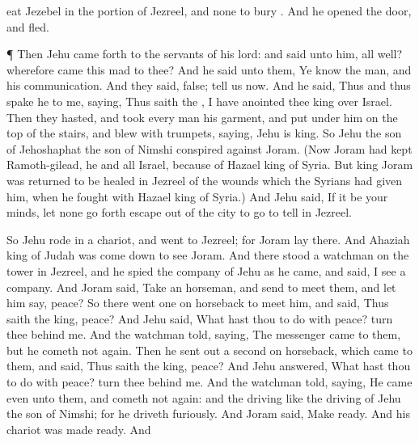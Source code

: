 {eat
Jezebel in the
portion of
Jezreel, and
{} none to
bury
{}. And he
opened the
door, and
fled.
\par }{\PP {}¶ Then
Jehu came
forth to the
servants of his
lord: and
{}
said unto him,
{} all
well? wherefore
came this
mad
{} to thee? And he
said unto them, Ye
know the
man, and his
communication.
And they
said,
{}
false;
tell us now. And he
said, Thus and thus
spake he to me,
saying, Thus
saith the
{}, I have
anointed thee
king over
Israel.
Then they
hasted, and
took every
man his
garment, and
put
{} under him on the
top of the
stairs, and
blew with
trumpets,
saying,
Jehu is
king.
So
Jehu the
son of
Jehoshaphat the
son of
Nimshi
conspired against
Joram. (Now
Joram had
kept
Ramoth-gilead, he and all
Israel,
because of
Hazael
king of
Syria.
But
king
Joram was
returned to be
healed in
Jezreel of the
wounds which the
Syrians had
given him, when he
fought with
Hazael
king of
Syria.) And
Jehu
said, If it
be your
minds,
{} let
none go
forth
{}
escape out of the
city to
go to
tell
{} in
Jezreel.
\par }{\PP {}So
Jehu rode in a
chariot, and
went to
Jezreel; for
Joram
lay there. And
Ahaziah
king of
Judah was come
down to
see
Joram.
And there
stood a
watchman on the
tower in
Jezreel, and he
spied the
company of
Jehu as he
came, and
said, I
see a
company. And
Joram
said,
Take an
horseman, and
send to
meet them, and let him
say,
{}
peace?
So there
went one on
horseback to
meet him, and
said, Thus
saith the
king,
{}
peace? And
Jehu
said, What hast thou to do with
peace?
turn thee
behind me. And the
watchman
told,
saying, The
messenger
came to them, but he cometh not
again.
Then he sent
out a
second on
horseback, which
came to them, and
said, Thus
saith the
king,
{}
peace? And
Jehu
answered, What hast thou to do with
peace?
turn thee
behind me.
And the
watchman
told,
saying, He
came even unto them, and cometh not
again: and the
driving
{} like the
driving of
Jehu the
son of
Nimshi; for he
driveth
furiously.
And
Joram
said, Make
ready. And his
chariot was made
ready. And
}
